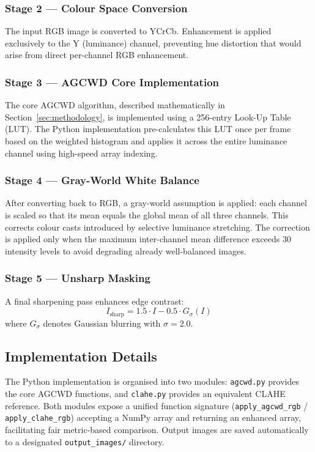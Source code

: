 \documentclass[conference]{IEEEtran}
\begin{document}
\subsubsection{Stage 2 — Colour Space Conversion}
The input RGB image is converted to YCrCb. Enhancement is applied exclusively to the Y (luminance) channel, preventing hue distortion that would arise from direct per-channel RGB enhancement.

\subsubsection{Stage 3 — AGCWD Core Implementation}
The core AGCWD algorithm, described mathematically in Section~\ref{sec:methodology}, is implemented using a 256-entry Look-Up Table (LUT). The Python implementation pre-calculates this LUT once per frame based on the weighted histogram and applies it across the entire luminance channel using high-speed array indexing.

\subsubsection{Stage 4 — Gray-World White Balance}
After converting back to RGB, a gray-world assumption is applied: each channel is scaled so that its mean equals the global mean of all three channels. This corrects colour casts introduced by selective luminance stretching. The correction is applied only when the maximum inter-channel mean difference exceeds 30 intensity levels to avoid degrading already well-balanced images.

\subsubsection{Stage 5 — Unsharp Masking}
A final sharpening pass enhances edge contrast:
\begin{equation}
  I_{\text{sharp}} = 1.5 \cdot I - 0.5 \cdot G_\sigma(I)
  \label{eq:unsharp}
\end{equation}
where $G_\sigma$ denotes Gaussian blurring with $\sigma = 2.0$.

\subsection{Implementation Details}

The Python implementation is organised into two modules: \texttt{agcwd.py} provides the core AGCWD functions, and \texttt{clahe.py} provides an equivalent CLAHE reference. Both modules expose a unified function signature (\texttt{apply\_agcwd\_rgb} / \texttt{apply\_clahe\_rgb}) accepting a NumPy array and returning an enhanced array, facilitating fair metric-based comparison. Output images are saved automatically to a designated \texttt{output\_images/} directory.
\end{document}

